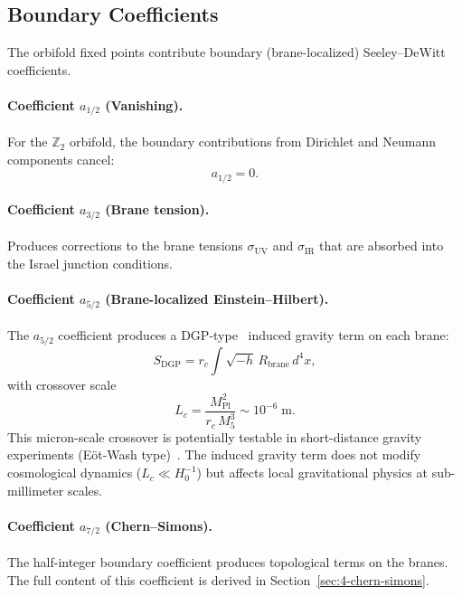 \subsection{Boundary Coefficients}
\label{sec:4-boundary-coefficients}

The orbifold fixed points contribute boundary (brane-localized) Seeley--DeWitt coefficients.

\paragraph{Coefficient $a_{1/2}$ (Vanishing).} For the $\mathbb{Z}_2$ orbifold, the boundary contributions from Dirichlet and Neumann components cancel:
\begin{equation}
  a_{1/2} = 0.
  \label{eq:4-28}
\end{equation}

\paragraph{Coefficient $a_{3/2}$ (Brane tension).} Produces corrections to the brane tensions $\sigma_{\mathrm{UV}}$ and $\sigma_{\mathrm{IR}}$ that are absorbed into the Israel junction conditions.

\paragraph{Coefficient $a_{5/2}$ (Brane-localized Einstein--Hilbert).}
The $a_{5/2}$ coefficient produces a DGP-type~\cite{ch4:DGP2000} induced gravity term on each brane:
\begin{equation}
  S_{\mathrm{DGP}} = r_c \int \sqrt{-h}\, R_{\mathrm{brane}}\, d^4x,
  \label{eq:4-29}
\end{equation}
with crossover scale
\begin{equation}
  L_c = \frac{M_{\mathrm{Pl}}^2}{r_c\, M_5^3} \sim 10^{-6}\;\mathrm{m}.
  \label{eq:4-30}
\end{equation}
This micron-scale crossover is potentially testable in short-distance gravity experiments (E\"ot-Wash type)~\cite{ch4:Kapner2007}. The induced gravity term does not modify cosmological dynamics ($L_c \ll H_0^{-1}$) but affects local gravitational physics at sub-millimeter scales.

\paragraph{Coefficient $a_{7/2}$ (Chern--Simons).}
The half-integer boundary coefficient produces topological terms on the branes. The full content of this coefficient is derived in Section~\ref{sec:4-chern-simons}.


